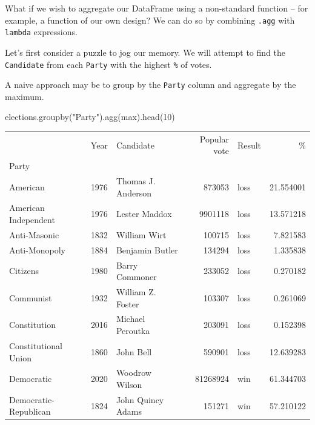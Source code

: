 \documentclass[
  letterpaper,
  DIV=11,
  numbers=noendperiod]{scrreprt}
\newenvironment{Shaded}{\begin{snugshade}}{\end{snugshade}}
\newcommand{\BuiltInTok}[1]{\textcolor[rgb]{0.00,0.23,0.31}{#1}}
\newcommand{\DecValTok}[1]{\textcolor[rgb]{0.68,0.00,0.00}{#1}}
\newcommand{\NormalTok}[1]{\textcolor[rgb]{0.00,0.23,0.31}{#1}}
\newcommand{\StringTok}[1]{\textcolor[rgb]{0.13,0.47,0.30}{#1}}
\begin{document}
What if we wish to aggregate our DataFrame using a non-standard function
-- for example, a function of our own design? We can do so by combining
\texttt{.agg} with \texttt{lambda} expressions.

Let's first consider a puzzle to jog our memory. We will attempt to find
the \texttt{Candidate} from each \texttt{Party} with the highest
\texttt{\%} of votes.

A naive approach may be to group by the \texttt{Party} column and
aggregate by the maximum.

\begin{Shaded}
\begin{Highlighting}[]
\NormalTok{elections.groupby(}\StringTok{"Party"}\NormalTok{).agg(}\BuiltInTok{max}\NormalTok{).head(}\DecValTok{10}\NormalTok{)}
\end{Highlighting}
\end{Shaded}

\begin{tabular}{lrlrlr}
\toprule
{} &  Year &           Candidate &  Popular vote & Result &          \% \\
Party                 &       &                     &               &        &            \\
\midrule
American              &  1976 &  Thomas J. Anderson &        873053 &   loss &  21.554001 \\
American Independent  &  1976 &       Lester Maddox &       9901118 &   loss &  13.571218 \\
Anti-Masonic          &  1832 &        William Wirt &        100715 &   loss &   7.821583 \\
Anti-Monopoly         &  1884 &     Benjamin Butler &        134294 &   loss &   1.335838 \\
Citizens              &  1980 &      Barry Commoner &        233052 &   loss &   0.270182 \\
Communist             &  1932 &   William Z. Foster &        103307 &   loss &   0.261069 \\
Constitution          &  2016 &    Michael Peroutka &        203091 &   loss &   0.152398 \\
Constitutional Union  &  1860 &           John Bell &        590901 &   loss &  12.639283 \\
Democratic            &  2020 &      Woodrow Wilson &      81268924 &    win &  61.344703 \\
Democratic-Republican &  1824 &   John Quincy Adams &        151271 &    win &  57.210122 \\
\bottomrule
\end{tabular}
\end{document}
